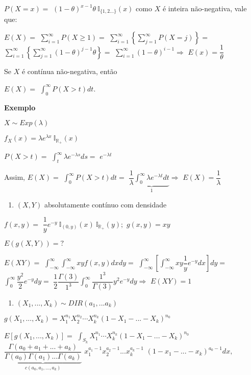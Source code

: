 \documentclass[
]{book}
\providecommand{\tightlist}{%
  \setlength{\itemsep}{0pt}\setlength{\parskip}{0pt}}
\begin{document}
\(P(X=x)=\) \((1-\theta)^{x-1}\theta ~\mathbb{I}_{\{1,2...\}}(x)\) como \(X\) é inteira não-negativa, vale que:

\(E(X)=\) \(\sum_{i=1}^\infty P(X \geq 1)=\) \(\sum_{i=1}^\infty \left\{\sum_{j=1}^\infty P(X=j)\right\}=\) \(\sum_{i=1}^\infty \left\{\sum_{j=1}^\infty (1-\theta)^{j-1}\theta\right\}=\) \(\sum_{i=1}^\infty (1-\theta)^{i-1}\Rightarrow\) \(E(x)=\dfrac{1}{\theta}\)

Se \(X\) é contínua não-negativa, então

\(E(X)=\) \(\int_0^\infty P(X>t)dt.\)

\textbf{Exemplo}

\(X\sim Exp(\lambda)\)

\(f_X(x)=\lambda e^{\lambda x}~\mathbb{I}_{\mathbb{R}_+}(x)\)

\(P(X > t)=\) \(\int_t^\infty \lambda e^{-\lambda s}ds=\) \(e^{-\lambda t}\)

Assim, \(E(X)=\) \(\int_0^\infty P(X>t)dt=\) \(\dfrac{1}{\lambda}\underbrace{\int_0^\infty \lambda e^{-\lambda t}dt}_{1} \Rightarrow\) \(E(X)=\dfrac{1}{\lambda}\)

\begin{enumerate}
\def\labelenumi{\arabic{enumi}.}
\setcounter{enumi}{4}
\tightlist
\item
  \((X,Y)\) absolutamente contínuo com densidade
\end{enumerate}

\(f(x,y)=\) \(\dfrac{1}{y}e^{-y}~\mathbb{I}_{(0,y)}(x)~\mathbb{I}_{\mathbb{R}_+}(y);\) \(g(x,y)=xy\)

\(E(g(X,Y))=?\)

\(E(XY)=\) \(\int_{-\infty}^\infty \int_{-\infty}^\infty xyf(x,y)dxdy=\) \(\int_{-\infty}^\infty \left[\int_{-\infty}^\infty xy\dfrac{1}{y}e^{-y}dx\right]dy=\) \(\int_{0}^\infty \dfrac{y^2}{2}e^{-y}dy=\) \(\dfrac{1}{2}\dfrac{\Gamma(3)}{1^3}\int_0^\infty \dfrac{1^3}{\Gamma(3)}y^2e^{-y}dy \Rightarrow\) \(E(XY)=1\)

\begin{enumerate}
\def\labelenumi{\arabic{enumi}.}
\setcounter{enumi}{5}
\tightlist
\item
  \((X_1,...,X_k) \sim DIR(a_1,...a_k)\)
\end{enumerate}

\(g(X_1,...,X_k) = X_1^{n_1}X_2^{n_2}\cdots X_k^{n_k}(1-X_1-...-X_k)^{n_0}\)

\(E[g(X_1,...,X_k)]=\) \(\int_{S_k} X_1^{n_1}\cdots X_k^{n_k}(1-X_1-...-X_k)^{n_0}\) \(\underbrace{\dfrac{\Gamma(a_0+a_1+...+a_k)}{\Gamma(a_0)\Gamma(a_1)...\Gamma(a_k)}}_{c(a_0,a_1,...,a_k)}\) \(x_1^{a_1-1}x_2^{a_2-1}...x_k^{a_k-1}\) \((1-x_1-...-x_k)^{a_0-1}dx,\)
\end{document}
